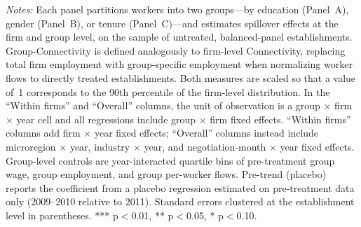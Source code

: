 \begin{table}[H]
\begin{minipage}{\linewidth}\vspace{4pt}\scriptsize\textit{Notes:} Each panel partitions workers into two groups---by education (Panel~A), gender (Panel~B), or tenure (Panel~C)---and estimates spillover effects at the firm and group level, on the sample of untreated, balanced-panel establishments. Group-Connectivity is defined analogously to firm-level Connectivity, replacing total firm employment with group-specific employment when normalizing worker flows to directly treated establishments. Both measures are scaled so that a value of~1 corresponds to the 90th percentile of the firm-level distribution. In the ``Within firms'' and ``Overall'' columns, the unit of observation is a group $\times$ firm $\times$ year cell and all regressions include group $\times$ firm fixed effects. ``Within firms'' columns add firm $\times$ year fixed effects; ``Overall'' columns instead include microregion $\times$ year, industry $\times$ year, and negotiation-month $\times$ year fixed effects. Group-level controls are year-interacted quartile bins of pre-treatment group wage, group employment, and group per-worker flows. Pre-trend (placebo) reports the coefficient from a placebo regression estimated on pre-treatment data only (2009--2010 relative to 2011). Standard errors clustered at the establishment level in parentheses. *** p$<$0.01, ** p$<$0.05, * p$<$0.10.\end{minipage}
\end{table}
